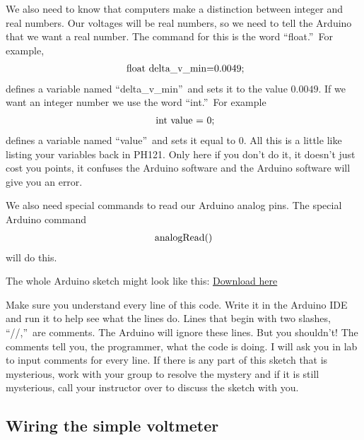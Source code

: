 We also need to know that computers make a distinction between integer and
real numbers. Our voltages will be real numbers, so we need to tell the
Arduino that we want a real number. The command for this is the word
\textquotedblleft float.\textquotedblright\ For example,%
\begin{equation*}
\begin{tabular}{l}
\ float\ delta\_v\_min=0.0049;%
\end{tabular}%
\end{equation*}%
defines a variable named \textquotedblleft delta\_v\_min\textquotedblright\
and sets it to the value $0.0049.$ If we want an integer number we use the
word \textquotedblleft int.\textquotedblright\ For example%
\begin{equation*}
\begin{tabular}{l}
\ int\ value\ =\ 0;%
\end{tabular}%
\end{equation*}%
defines a variable named \textquotedblleft value\textquotedblright\ and sets
it equal to $0.$ All this is a little like listing your variables back in
PH121. Only here if you don't do it, it doesn't just cost you points, it
confuses the Arduino software and the Arduino software will give you an
error.

We also need special commands to read our Arduino analog pins. The special
Arduino command 
\begin{equation*}
\begin{tabular}{l}
analogRead()%
\end{tabular}%
\end{equation*}%
will do this.

The whole Arduino sketch might look like this:
\href{https://dtoliphant.github.io/PH250Manual/Code/DAQ_voltmeter.ino}{Download here}



Make sure you understand every line of this code. Write it in the Arduino
IDE and run it to help see what the lines do. Lines that begin with two
slashes, \textquotedblleft //,\textquotedblright\ are comments. The Arduino
will ignore these lines. But you shouldn't! The comments tell you, the
programmer, what the code is doing. I will ask you in lab to input comments
for every line. If there is any part of this sketch that is mysterious, work
with your group to resolve the mystery and if it is still mysterious, call
your instructor over to discuss the sketch with you.

\subsection{Wiring the simple voltmeter}


